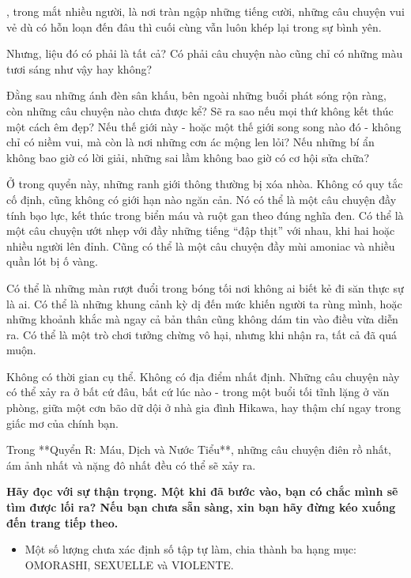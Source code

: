 \documentclass[main.tex]{subfiles}
\begin{document}
\hll, trong mắt nhiều người, là nơi tràn ngập những tiếng cười, những câu chuyện vui vẻ dù có hỗn loạn đến đâu thì cuối cùng vẫn luôn khép lại trong sự bình yên.

Nhưng, liệu đó có phải là tất cả? Có phải câu chuyện nào cũng chỉ có những màu tươi sáng như vậy hay không?

Đằng sau những ánh đèn sân khấu, bên ngoài những buổi phát sóng rộn ràng, còn những câu chuyện nào chưa được kể? Sẽ ra sao nếu mọi thứ không kết thúc một cách êm đẹp? Nếu thế giới này - hoặc một thế giới song song nào đó - không chỉ có niềm vui, mà còn là nơi những cơn ác mộng len lỏi? Nếu những bí ẩn không bao giờ có lời giải, những sai lầm không bao giờ có cơ hội sửa chữa?

Ở trong quyển này, những ranh giới thông thường bị xóa nhòa. Không có quy tắc cố định, cũng không có giới hạn nào ngăn cản. Nó có thể là một câu chuyện đầy tính bạo lực, kết thúc trong biển máu và ruột gan theo đúng nghĩa đen. Có thể là một câu chuyện ướt nhẹp với đầy những tiếng ``đập thịt'' với nhau, khi hai hoặc nhiều người lên đỉnh. Cũng có thể là một câu chuyện đầy mùi amoniac và nhiều quần lót bị ố vàng.

Có thể là những màn rượt đuổi trong bóng tối nơi không ai biết kẻ đi săn thực sự là ai. Có thể là những khung cảnh kỳ dị đến mức khiến người ta rùng mình, hoặc những khoảnh khắc mà ngay cả bản thân cũng không dám tin vào điều vừa diễn ra. Có thể là một trò chơi tưởng chừng vô hại, nhưng khi nhận ra, tất cả đã quá muộn.

Không có thời gian cụ thể. Không có địa điểm nhất định. Những câu chuyện này có thể xảy ra ở bất cứ đâu, bất cứ lúc nào - trong một buổi tối tĩnh lặng ở văn phòng, giữa một cơn bão dữ dội ở nhà gia đình Hikawa, hay thậm chí ngay trong giấc mơ của chính bạn.

Trong **Quyển R: Máu, Dịch và Nước Tiểu**, những câu chuyện điên rồ nhất, ám ảnh nhất và nặng đô nhất đều có thể sẽ xảy ra.

\textbf{Hãy đọc với sự thận trọng. Một khi đã bước vào, bạn có chắc mình sẽ tìm được lối ra? Nếu bạn chưa sẵn sàng, xin bạn hãy đừng kéo xuống đến trang tiếp theo.}

{}
\begin{itemize}
\item Một số lượng chưa xác định số tập tự làm, chia thành ba hạng mục: {\flaregothic \color{gold} OMORASHI}, {\flaregothic \color{violet} SEXUELLE} và {\flaregothic \color{red} VIOLENTE}.
\end{itemize}
\end{document}
